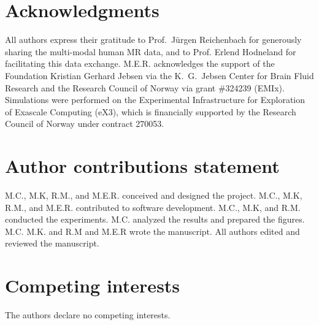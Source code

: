 \documentclass[fleqn,10pt]{wlscirep}
\begin{document}
\section*{Acknowledgments}

All authors express their gratitude to Prof.~Jürgen Reichenbach for
generously sharing the multi-modal human MR data, and to Prof. Erlend
Hodneland for facilitating this data exchange. M.E.R. acknowledges the
support of the Foundation Kristian Gerhard Jebsen via the K.~G.~Jebsen
Center for Brain Fluid Research and the Research Council of Norway via
grant \#324239 (EMIx). Simulations were performed on the Experimental
Infrastructure for Exploration of Exascale Computing (eX3), which is
financially supported by the Research Council of Norway under contract
270053.

\section*{Author contributions statement}

M.C., M.K, R.M., and M.E.R. conceived and designed the project.
M.C., M.K, R.M., and M.E.R. contributed to software development. 
M.C., M.K, and R.M. conducted the experiments.
M.C. analyzed the results and prepared the figures.
M.C. M.K. and R.M and M.E.R wrote the manuscript. 
All authors edited and reviewed the manuscript.

\section*{Competing interests}

The authors declare no competing interests.



\newpage
\FloatBarrier
\appendix


\newpage
\FloatBarrier

\end{document}
